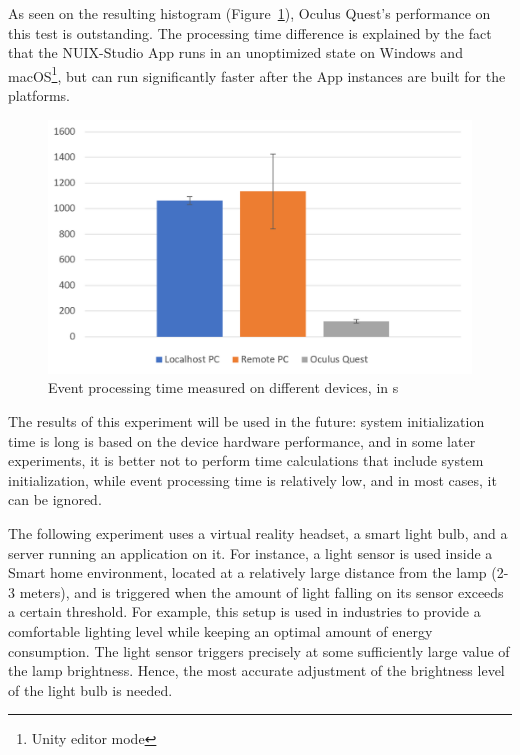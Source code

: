 As seen on the resulting histogram (Figure~\ref{fig:EventProcessingTime-figure}), Oculus Quest's performance on this test is outstanding. The processing time difference is explained by the fact that the NUIX-Studio App runs in an unoptimized state on Windows and macOS\footnote{Unity editor mode}, but can run significantly faster after the App instances are built for the platforms.

\begin{figure}
  \centering
  \includegraphics[width = 0.9 \linewidth]{figures/EventProcessingTime.png}
  \caption{Event processing time measured on different devices, in \textmu{}s}
  \label{fig:EventProcessingTime-figure}
\end{figure}

The results of this experiment will be used in the future: system initialization time is long is based on the device hardware performance, and in some later experiments, it is better not to perform time calculations that include system initialization, while event processing time is relatively low, and in most cases, it can be ignored.

The following experiment uses a virtual reality headset, a smart light bulb, and a server running an application on it. For instance, a light sensor is used inside a Smart home environment, located at a relatively large distance from the lamp (2-3 meters), and is triggered when the amount of light falling on its sensor exceeds a certain threshold. For example, this setup is used in industries to provide a comfortable lighting level while keeping an optimal amount of energy consumption. The light sensor triggers precisely at some sufficiently large value of the lamp brightness. Hence, the most accurate adjustment of the brightness level of the light bulb is needed.

